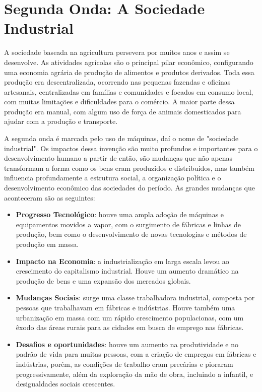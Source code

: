 \section{
    Segunda Onda: A Sociedade Industrial
    }

\setlength{\parindent}{4em}
\setlength{\parskip}{0.5em}
\renewcommand{\baselinestretch}{1}

A sociedade baseada na agricultura persevera por muitos anos e assim se desenvolve. As atividades agrícolas são o principal pilar econômico, configurando uma economia agrária de produção de alimentos e produtos derivados. Toda essa produção era descentralizada, ocorrendo nas pequenas fazendas e oficinas artesanais, centralizadas em famílias e comunidades e focados em consumo local, com muitas limitações e dificuldades para o comércio. A maior parte dessa produção era manual, com algum uso de força de animais domesticados para ajudar com a produção e transporte.

A segunda onda é marcada pelo uso de máquinas, daí o nome de "sociedade industrial". Os impactos dessa invenção são muito profundos e importantes para o desenvolvimento humano a partir de então, são mudanças que não apenas transformam a forma como os bens eram produzidos e distribuídos, mas também influencia profundamente a estrutura social, a organização política e o desenvolvimento econômico das sociedades do período. As grandes mudanças que aconteceram são as seguintes:

\begin{itemize}
	\item \textbf{Progresso Tecnológico}: houve uma ampla adoção de máquinas e equipamentos movidos a vapor, com o surgimento de fábricas e linhas de produção, bem como o desenvolvimento de novas tecnologias e métodos de produção em massa.
	\item \textbf{Impacto na Economia}: a industrialização em larga escala levou ao crescimento do capitalismo industrial. Houve um aumento dramático na produção de bens e uma expansão dos mercados globais.
	\item \textbf{Mudanças Sociais}: surge uma classe trabalhadora industrial, composta por pessoas que trabalhavam em fábricas e indústrias. Houve também uma urbanização em massa com um rápido crescimento populacionas, com um êxodo das áreas rurais para as cidades em busca de emprego nas fábricas.
	\item \textbf{Desafios e oportunidades}: houve um aumento na produtividade e no padrão de vida para muitas pessoas, com a criação de empregos em fábricas e indústrias, porém, as condições de trabalho eram precárias e pioraram progressivamente, além da  exploração da mão de obra, incluindo a infantil, e desigualdades sociais crescentes.
\end{itemize}

